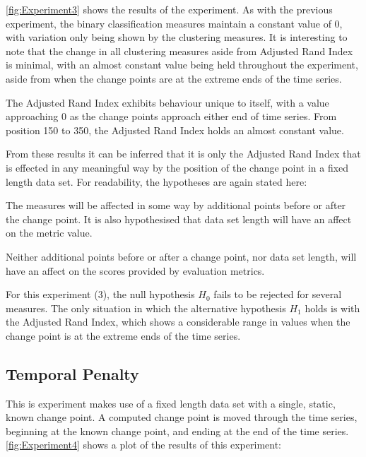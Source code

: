 \documentclass[../main.tex]{subfiles}
\begin{document}
\autoref{fig:Experiment3} shows the results of the experiment. As with the previous experiment, the binary classification measures maintain a constant value of $0$, with variation only being shown by the clustering measures. It is interesting to note that the change in all clustering measures aside from Adjusted Rand Index is minimal, with an almost constant value being held throughout the experiment, aside from when the change points are at the extreme ends of the time series.

The Adjusted Rand Index exhibits behaviour unique to itself, with a value approaching 0 as the change points approach either end of time series. From position 150 to 350, the Adjusted Rand Index holds an almost constant value.

From these results it can be inferred that it is only the Adjusted Rand Index that is effected in any meaningful way by the position of the change point in a fixed length data set. For readability, the hypotheses are again stated here:

\begin{hypothesis*}
    The measures will be affected in some way by additional points before or after the change point. It is also hypothesised that data set length will have an affect on the metric value.
\end{hypothesis*}

\begin{nullhypothesis*}
    Neither additional points before or after a change point, nor data set length, will have an affect on the scores provided by evaluation metrics.
\end{nullhypothesis*}

For this experiment (3), the null hypothesis $H_0$ fails to be rejected for several measures. The only situation in which the alternative hypothesis $H_1$ holds is with the Adjusted Rand Index, which shows a considerable range in values when the change point is at the extreme ends of the time series.

\subsection{Temporal Penalty}

This is experiment makes use of a fixed length data set with a single, static, known change point. A computed change point is moved through the time series, beginning at the known change point, and ending at the end of the time series. \autoref{fig:Experiment4} shows a plot of the results of this experiment:
\end{document}
